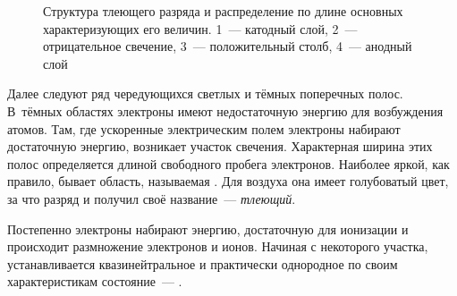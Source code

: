 \begin{labsupplement}



\begin{figure}[h!]
	\centering
	\caption{Структура тлеющего разряда и распределение по длине основных 
        характеризующих его величин. 
        1~--- катодный слой,
        2~--- отрицательное свечение,
        3~--- положительный столб,
        4~--- анодный слой
        }
\end{figure}

Далее следуют ряд чередующихся светлых и тёмных поперечных полос. 
В~тёмных областях электроны имеют недостаточную энергию 
для возбуждения атомов. Там, где ускоренные электрическим полем электроны 
набирают достаточную энергию, возникает участок свечения.
Характерная ширина этих полос определяется длиной свободного пробега электронов.
Наиболее яркой, как правило, бывает область,
называемая .
Для воздуха она имеет голубоватый цвет, за что разряд и получил своё 
название~--- \emph{тлеющий}.

Постепенно электроны набирают энергию, достаточную для ионизации
и происходит размножение электронов и ионов.
Начиная с некоторого участка, устанавливается квазинейтральное
и практически однородное по своим характеристикам состояние~--- 
.





\end{labsupplement}
